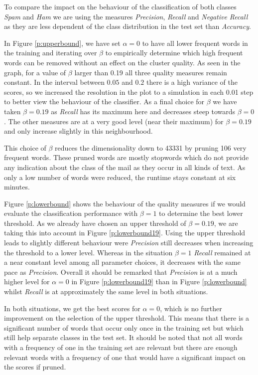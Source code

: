 

To compare the impact on the behaviour of the classification of both classes \emph{Spam} and \emph{Ham} we are using the measures \emph{Precision}, \emph{Recall} and \emph{Negative Recall} as they are less dependent of the class distribution in the test set than \emph{Accuracy}.

In Figure \ref{p:upperbound}, we have set $\alpha = 0$ to have all lower frequent words in the training and iterating over $\beta$ to empirically determine which high frequent words can be removed without an effect on the cluster quality.
As seen in the graph, for a value of $\beta$ larger than 0.19 all three quality measures remain constant.
In the interval between $0.05$ and $0.2$ there is a high variance of the scores, so we increased the resolution in the plot to a simulation in each 0.01 step to better view the behaviour of the classifier.
As a final choice for $\beta$ we have taken $\beta = 0.19$ as \emph{Recall} has its maximum here and decreases steep towards $\beta = 0$.
The other measures are at a very good level (near their maximum) for $\beta = 0.19$ and only increase slightly in this neighbourhood.

This choice of $\beta$ reduces the dimensionality down to 43331 by pruning 106 very frequent words.
These pruned words are mostly stopwords which do not provide any indication about the class of the mail as they occur in all kinds of text.
As only a low number of words were reduced, the runtime stays constant at six minutes.



Figure \ref{p:lowerbound} shows the behaviour of the quality measures if we would evaluate the classification performance with $\beta=1$ to determine the best lower threshold.
As we already have chosen an upper threshold of $\beta = 0.19$, we are taking this into account in Figure \ref{p:lowerbound19}.
Using the upper threshold leads to slightly different behaviour were \emph{Precision} still decreases when increasing the threshold to a lower level.
Whereas in the situation $\beta = 1$ \emph{Recall} remained at a near constant level among all parameter choices, it decreases with the same pace as \emph{Precision}.
Overall it should be remarked that \emph{Precision} is at a much higher level for $\alpha = 0$ in Figure \ref{p:lowerbound19} than in Figure \ref{p:lowerbound} whilst \emph{Recall} is at approximately the same level in both situations.

In both situations, we get the best scores for $\alpha=0$, which is no further improvement on the selection of the upper threshold.
This means that there is a significant number of words that occur only once in the training set but which still help separate classes in the test set.
It should be noted that not all words with a frequency of one in the training set are relevant but there are enough relevant words with a frequency of one that would have a significant impact on the scores if pruned.

